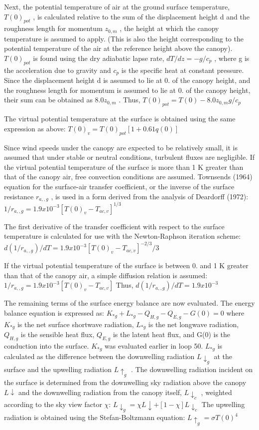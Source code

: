 Next, the potential temperature of air at the ground surface temperature, $T(0)_{pot}$ , is calculated relative to the sum of the displacement height d and the roughness length for momentum $z_{0,m}$ , the height at which the canopy temperature is assumed to apply. (This is also the height corresponding to the potential temperature of the air at the reference height above the canopy). $T(0)_{pot}$ is found using the dry adiabatic lapse rate, $dT/dz = -g/c_p$ , where g is the acceleration due to gravity and $c_p$ is the specific heat at constant pressure. Since the displacement height d is assumed to lie at 0. of the canopy height, and the roughness length for momentum is assumed to lie at 0. of the canopy height, their sum can be obtained as $8.0 z_{0,m}$ . Thus, $T(0)_{pot} = T(0) - 8.0 z_{0,m} g/c_p$

The virtual potential temperature at the surface is obtained using the same expression as above\+: $T(0)_v = T(0)_{pot} [1 + 0.61 q(0)]$

Since wind speeds under the canopy are expected to be relatively small, it is assumed that under stable or neutral conditions, turbulent fluxes are negligible. If the virtual potential temperature of the surface is more than 1 K greater than that of the canopy air, free convection conditions are assumed. Townsend\textquotesingle{}s (1964) equation for the surface-\/air transfer coefficient, or the inverse of the surface resistance $r_{a,,g}$ , is used in a form derived from the analysis of Deardorff (1972)\+: $1/r_{a,,g} = 1.9 x 10^{-3} [T(0)_v - T_{ac,v} ]^{1/3}$

The first derivative of the transfer coefficient with respect to the surface temperature is calculated for use with the Newton-\/\+Raphson iteration scheme\+: $d(1/r_{a,,g} )/dT = 1.9 x 10^{-3} [T(0)_v - T_{ac,v} ]^{-2/3} /3$

If the virtual potential temperature of the surface is between 0. and 1 K greater than that of the canopy air, a simple diffusion relation is assumed\+: $1/r_{a,,g} = 1.9 x 10^{-3} [T(0)_v - T_{ac,v} ]$ Thus, $d(1/r_{a,,g} )/dT = 1.9 x 10^{-3}$

The remaining terms of the surface energy balance are now evaluated. The energy balance equation is expressed as\+: $K_{*g} + L_{*g} - Q_{H,g} - Q_{E,g} - G(0) = 0$ where $K_{*g}$ is the net surface shortwave radiation, $L_{*g}$ is the net longwave radiation, $Q_{H,g}$ is the sensible heat flux, $Q_{E,g}$ is the latent heat flux, and G(0) is the conduction into the surface. $K_{*g}$ was evaluated earlier in loop 50. $L_{*g}$ is calculated as the difference between the downwelling radiation $L \downarrow_g$ at the surface and the upwelling radiation $L \uparrow_g$ . The downwelling radiation incident on the surface is determined from the downwelling sky radiation above the canopy $L \downarrow$ and the downwelling radiation from the canopy itself, $L \downarrow_c$ , weighted according to the sky view factor $\chi$\+: $L \downarrow_g = \chi L \downarrow + [1 - \chi] L \downarrow_c$ The upwelling radiation is obtained using the Stefan-\/\+Boltzmann equation\+: $L \uparrow_g = \sigma T(0)^4$

